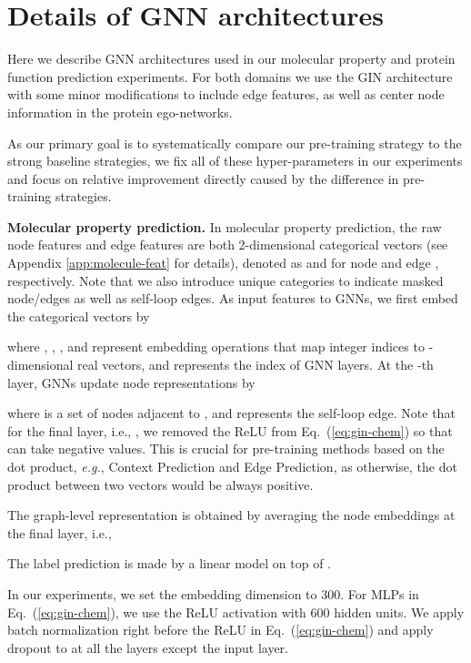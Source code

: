 \documentclass{article} \usepackage{iclr2020_conference,times}
\def\eqref#1{Eq.~(\ref{#1})}
\numberwithin{equation}{section}
\theoremstyle{plain}
\theoremstyle{definition}
\theoremstyle{remark}
\newcommand{\eg}{\textit{e.g.}}
\def\eqref#1{Eq.~(\ref{#1})}
\begin{document}




\newpage 

\appendix

\section{Details of GNN architectures}

\label{app:gnn-architecture}
Here we describe GNN architectures used in our molecular property and protein function prediction experiments. For both domains we use the GIN architecture \citep{xu2018how} with some minor modifications to include edge features, as well as center node information in the protein ego-networks.

As our primary goal is to systematically compare our pre-training strategy to the strong baseline strategies, we fix all of these hyper-parameters in our experiments and focus on relative improvement directly caused by the difference in pre-training strategies.

{\bf Molecular property prediction.}
In molecular property prediction, the raw node features and edge features are both 2-dimensional categorical vectors (see Appendix \ref{app:molecule-feat} for details), denoted as  and  for node  and edge , respectively. Note that we also introduce unique categories to indicate masked node/edges as well as self-loop edges. As input features to GNNs, we first embed the categorical vectors by

where , , , and  represent embedding operations that map integer indices to -dimensional real vectors, and  represents the index of GNN layers. At the -th layer, GNNs update node representations by

where  is a set of nodes adjacent to , and  represents the self-loop edge. Note that for the final layer, i.e., , we removed the ReLU from \eqref{eq:gin-chem} so that  can take negative values. This is crucial for pre-training methods based on the dot product, \eg, Context Prediction and Edge Prediction, as otherwise, the dot product between two vectors would be always positive.

The graph-level representation  is obtained by averaging the node embeddings at the final layer, i.e., 

The label prediction is made by a linear model on top of .

In our experiments, we set the embedding dimension  to 300. For MLPs in \eqref{eq:gin-chem}, we use the ReLU activation with 600 hidden units. We apply batch normalization \citep{ioffe2015batch} right before the ReLU in \eqref{eq:gin-chem} and apply dropout \citep{srivastava2014dropout} to  at all the layers except the input layer.
\end{document}

